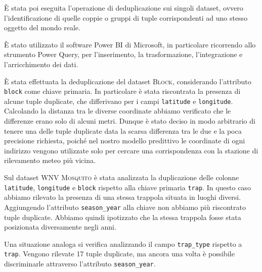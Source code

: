 È stata poi eseguita l'operazione di deduplicazione sui singoli dataset, ovvero 
l'identificazione di quelle coppie o gruppi di tuple corrispondenti ad uno 
stesso oggetto del mondo reale.

È stato utilizzato il software Power BI di Microsoft, in particolare ricorrendo 
allo strumento Power Query, per l'inserimento, la trasformazione, 
l'integrazione e l'arricchimento dei dati.

È stata effettuata la deduplicazione del dataset \textsc{Block}, considerando
l'attributo \texttt{block} come chiave primaria. In particolare è stata 
riscontrata la presenza di alcune tuple duplicate, che differivano per i campi 
\texttt{latitude} e \texttt{longitude}. Calcolando la distanza tra le diverse 
coordinate abbiamo verificato che le differenze erano solo di alcuni metri.
Dunque è stato deciso in modo arbitrario di tenere una delle tuple duplicate 
data la scarsa differenza tra le due e la poca precisione richiesta, 
poiché nel nostro modello predittivo le coordinate di ogni indirizzo vengono 
utilizzate solo per cercare una corrispondenza con la stazione di rilevamento 
meteo più vicina.

Sul dataset \textsc{WNV Mosquito} è stata analizzata la duplicazione 
delle colonne \texttt{latitude}, \texttt{longitude} e \texttt{block} rispetto 
alla chiave primaria \texttt{trap}. In questo caso abbiamo rilevato la presenza 
di una stessa trappola situata in luoghi diversi. Aggiungendo l'attributo 
\texttt{season\_year} alla chiave non abbiamo più riscontrato tuple duplicate. 
Abbiamo quindi ipotizzato che la stessa trappola fosse stata posizionata 
diversamente negli anni.

Una situazione analoga si verifica analizzando il campo \texttt{trap\_type} 
rispetto a \texttt{trap}. Vengono rilevate 17 tuple duplicate, ma ancora una 
volta è possibile discriminarle attraverso l'attributo \texttt{season\_year}.
